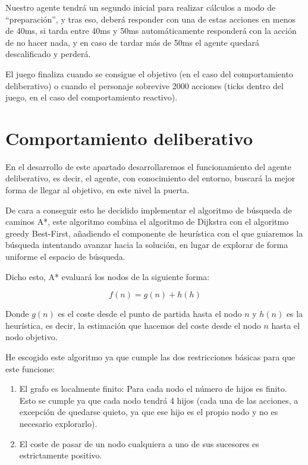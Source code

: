 \documentclass[10pt, spanish]{article}
\begin{document}
Nuestro agente tendrá un segundo inicial para realizar cálculos a modo de ``preparación'', y tras eso, deberá responder con una de estas acciones en menos de 40ms, si tarda entre 40ms y 50ms automáticamente responderá con la acción de no hacer nada, y en caso de tardar más de 50ms el agente quedará descalificado y perderá.

El juego finaliza cuando se consigue el objetivo (en el caso del comportamiento deliberativo) o cuando el personaje sobrevive 2000 acciones (ticks dentro del juego, en el caso del comportamiento reactivo).

\section{Comportamiento deliberativo}

En el desarrollo de este apartado desarrollaremos el funcionamiento del agente deliberativo, es decir, el agente, con conocimiento del entorno, buscará la mejor forma de llegar al objetivo, en este nivel la puerta.

De cara a conseguir esto he decidido implementar el algoritmo de búsqueda de caminos A*, este algoritmo combina el algoritmo de Dijkstra con el algoritmo greedy Best-First, añadiendo el componente de heurística con el que guiaremos la búsqueda intentando avanzar hacia la solución, en lugar de explorar de forma uniforme el espacio de búsqueda.

Dicho esto, A* evaluará los nodos de la siguiente forma:

$$ f(n) = g(n) + h(h) $$

Donde $g(n)$ es el coste desde el punto de partida hasta el nodo $n$ y $h(n)$ es la heurística, es decir, la estimación que hacemos del coste desde el nodo $n$ hasta el nodo objetivo.

He escogido este algoritmo ya que cumple las dos restricciones básicas para que este funcione:

\begin{enumerate}
	\item El grafo es localmente finito: Para cada nodo el número de hijos es finito. Esto se cumple ya que cada nodo tendrá 4 hijos (cada una de las acciones, a excepción de quedarse quieto, ya que ese hijo es el propio nodo y no es necesario explorarlo).
	\item El coste de pasar de un nodo cualquiera a uno de sus sucesores es estrictamente positivo.
\end{enumerate}
\end{document}

